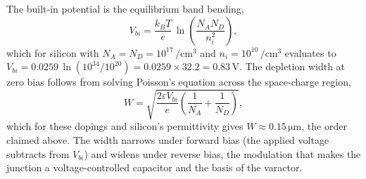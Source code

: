 

The built-in potential is the equilibrium band bending,
\[
V_{bi} = \frac{k_{B}T}{e}\,\ln\!\left(\frac{N_{A}N_{D}}{n_{i}^{2}}
\right),
\]
which for silicon with $N_{A} = N_{D} = 10^{17}\,\si{\per\centi\meter
\cubed}$ and $n_{i} = 10^{10}\,\si{\per\centi\meter\cubed}$ evaluates to
$V_{bi} = 0.0259\,\ln(10^{34}/10^{20}) = 0.0259 \times 32.2 = 0.83\,\si{
\volt}$. The depletion width at zero bias follows from solving Poisson's
equation across the space-charge region,
\[
W = \sqrt{\frac{2\varepsilon V_{bi}}{e}\left(\frac{1}{N_{A}} +
\frac{1}{N_{D}}\right)},
\]
which for these dopings and silicon's permittivity gives $W \approx
0.15\,\si{\micro\meter}$, the order claimed above. The width narrows
under forward bias (the applied voltage subtracts from $V_{bi}$) and
widens under reverse bias, the modulation that makes the junction a
voltage-controlled capacitor and the basis of the varactor.

